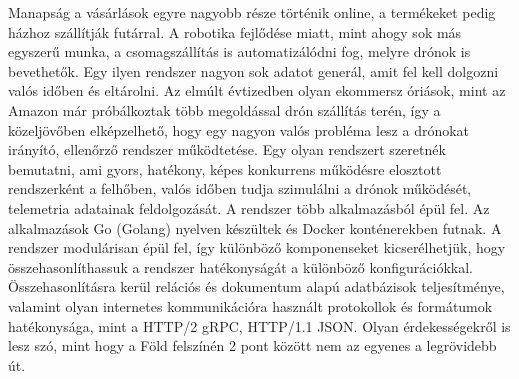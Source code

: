 
Manapság a vásárlások egyre nagyobb része történik online, a termékeket pedig házhoz szállítják futárral.
A robotika fejlődése miatt, mint ahogy sok más egyszerű munka, a csomagszállítás is automatizálódni fog, melyre drónok is bevethetők.
Egy ilyen rendszer nagyon sok adatot generál, amit fel kell dolgozni valós időben és eltárolni.
Az elmúlt évtizedben olyan ekommersz óriások, mint az Amazon már próbálkoztak több megoldással drón szállítás terén, így a közeljövőben elképzelhető, hogy egy nagyon valós probléma lesz a drónokat irányító, ellenőrző rendszer működtetése.
Egy olyan rendszert szeretnék bemutatni, ami gyors, hatékony, képes konkurrens működésre elosztott rendszerként a felhőben, valós időben tudja szimulálni a drónok működését, telemetria adatainak feldolgozását.
A rendszer több alkalmazásból épül fel. Az alkalmazások Go (Golang) nyelven készültek és Docker konténerekben futnak.
A rendszer modulárisan épül fel, így különböző komponenseket kicserélhetjük, hogy összehasonlíthassuk a rendszer hatékonyságát a különböző konfigurációkkal.
Összehasonlításra kerül relációs és dokumentum alapú adatbázisok teljesítménye, valamint olyan internetes kommunikációra használt protokollok és formátumok hatékonysága, mint a HTTP/2 gRPC, HTTP/1.1 JSON.
Olyan érdekességekről is lesz szó, mint hogy a Föld felszínén 2 pont között nem az egyenes a legrövidebb út.



